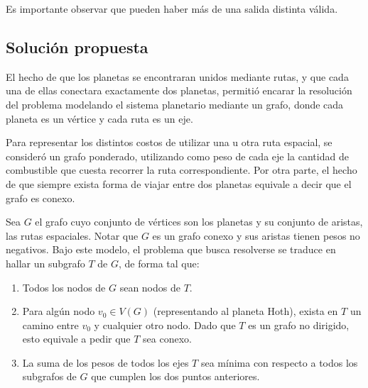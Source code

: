    Es importante observar que pueden haber más de una salida distinta válida.

    \subsection{Solución propuesta}

    El hecho de que los planetas se encontraran unidos mediante rutas, y que
    cada una de ellas conectara exactamente dos planetas, permitió encarar la
    resolución del problema modelando el sistema planetario mediante un
    grafo, donde cada planeta es un vértice y cada ruta es un eje.

    Para representar los distintos costos de utilizar una u otra ruta
    espacial, se consideró un grafo ponderado, utilizando como peso de cada
    eje la cantidad de combustible que cuesta recorrer la ruta
    correspondiente. Por otra parte, el hecho de que siempre exista forma de
    viajar entre dos planetas equivale a decir que el grafo es conexo.

    Sea $G$ el grafo cuyo conjunto de vértices son los planetas y su conjunto
    de aristas, las rutas espaciales. Notar que $G$ es un grafo conexo y
    sus aristas tienen pesos no negativos. Bajo este modelo, el problema que
    busca resolverse se traduce en hallar un subgrafo $T$ de $G$, de forma tal
    que:
    \begin{enumerate}
        \item Todos los nodos de $G$ sean nodos de $T$.
        \item Para algún nodo $v_0 \in V(G)$ (representando al planeta Hoth),
        exista en $T$ un camino entre $v_0$ y cualquier otro nodo. Dado que
        $T$ es un grafo no dirigido, esto equivale a pedir que $T$ sea conexo.
        \item La suma de los pesos de todos los ejes $T$ sea mínima con
        respecto a todos los subgrafos de $G$ que cumplen los dos puntos
        anteriores.
    \end{enumerate}


